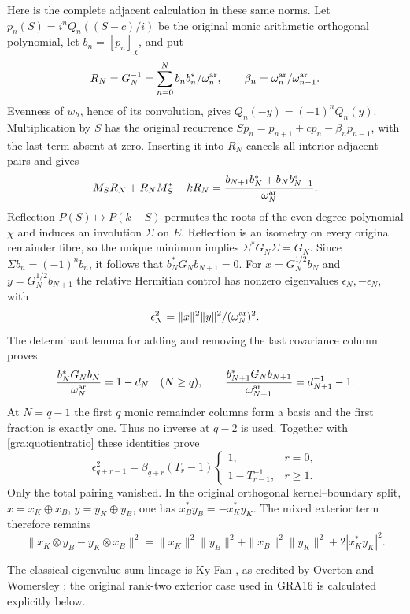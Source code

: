 \documentclass[11pt,a4paper]{article}
\begin{document}
Here is the complete adjacent calculation in these same norms.  Let
$p_n(S)=i^nQ_n((S-c)/i)$ be the original monic arithmetic orthogonal
polynomial, let $b_n=[p_n]_\chi$, and put
\[
 R_N=G_N^{-1}=\sum_{n=0}^N b_nb_n^*/\omega_n^{\rm ar},\qquad
 \beta_n=\omega_n^{\rm ar}/\omega_{n-1}^{\rm ar}.
\]
Evenness of $w_h$, hence of its convolution, gives $Q_n(-y)=(-1)^nQ_n(y)$.
Multiplication by $S$ has the original recurrence
$Sp_n=p_{n+1}+cp_n-\beta_np_{n-1}$, with the last term absent at zero.
Inserting it into $R_N$ cancels all interior adjacent pairs and gives
\[
 M_SR_N+R_NM_S^*-kR_N
 =\frac{b_{N+1}b_N^*+b_Nb_{N+1}^*}{\omega_N^{\rm ar}}.
\]
Reflection $P(S)\mapsto P(k-S)$ permutes the roots of the even-degree
polynomial $\chi$ and induces an involution $\Sigma$ on $E$.
Reflection is an isometry on every original remainder fibre, so the
unique minimum implies $\Sigma^*G_N\Sigma=G_N$.  Since
$\Sigma b_n=(-1)^nb_n$, it follows that $b_N^*G_Nb_{N+1}=0$.
For $x=G_N^{1/2}b_N$ and $y=G_N^{1/2}b_{N+1}$ the relative Hermitian
control has nonzero eigenvalues $\epsilon_N,-\epsilon_N$, with
\[
 \epsilon_N^2=\|x\|^2\|y\|^2/(\omega_N^{\rm ar})^2.
\]
The determinant lemma for adding and removing the last covariance column
proves
\[
 \frac{b_N^*G_Nb_N}{\omega_N^{\rm ar}}=1-d_N\quad(N\ge q),
 \qquad
 \frac{b_{N+1}^*G_Nb_{N+1}}{\omega_{N+1}^{\rm ar}}=d_{N+1}^{-1}-1.
\]
At $N=q-1$ the first $q$ monic remainder columns form a basis and the first
fraction is exactly one.  Thus no inverse at $q-2$ is used.  Together
with \eqref{gra:quotientratio} these identities prove
\begin{equation}
 \epsilon_{q+r-1}^2=\beta_{q+r}(T_r-1)
 \begin{cases}1,&r=0,\\1-T_{r-1}^{-1},&r\ge1.\end{cases}
 \tag{GRA14}\label{gra:adjacent}
\end{equation}
Only the total pairing vanished.  In the original orthogonal
kernel--boundary split, $x=x_K\oplus x_B$, $y=y_K\oplus y_B$, one has
$x_B^*y_B=-x_K^*y_K$.  The mixed exterior term therefore remains
\begin{equation}
 \|x_K\otimes y_B-y_K\otimes x_B\|^2
 =\|x_K\|^2\|y_B\|^2+\|x_B\|^2\|y_K\|^2+2|x_K^*y_K|^2.
 \tag{GRA15}\label{gra:mixed}
\end{equation}



The classical eigenvalue-sum lineage is Ky Fan
\cite{human:fan1949}, as credited by Overton and Womersley
\cite{human:overton1992}; the original rank-two exterior case
used in GRA16 is calculated explicitly below.
\end{document}
